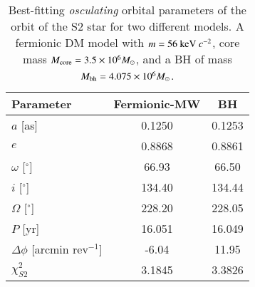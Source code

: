 \documentclass[twocolumn]{aa}
\begin{document}
\begin{table}[t]
\caption{Best-fitting \textit{osculating} orbital parameters of the orbit of the S2 star for two different models. A fermionic DM model with $m=56~{\rm keV}~c^{-2}$, core mass $M_{\rm{core}}=3.5\times 10^6 M_\odot$, and a BH of mass  $M_{\rm bh}=4.075\times 10^6 M_\odot$.}
\centering
\begin{tabular}{lcc}
\hline
Parameter & Fermionic-MW & BH \\
\hline
$a$ [as] & 0.1250 & 0.1253 \\
$e$ & 0.8868 & 0.8861 \\
$\omega$ [$^{\circ}$] & 66.93 & 66.50 \\
$i$ [$^{\circ}$] & 134.40 & 134.44 \\
$\Omega$ [$^{\circ}$] & 228.20 & 228.05 \\
$P$ [yr] & 16.051 & 16.049 \\
$\Delta \phi$ [arcmin rev$^{-1}$] & -6.04 & 11.95 \\
\hline
$\chi^2_{S2}$ & 3.1845 & 3.3826 \\ \hline
\end{tabular}
\label{tab:S2}
\end{table}
%
\end{document}
